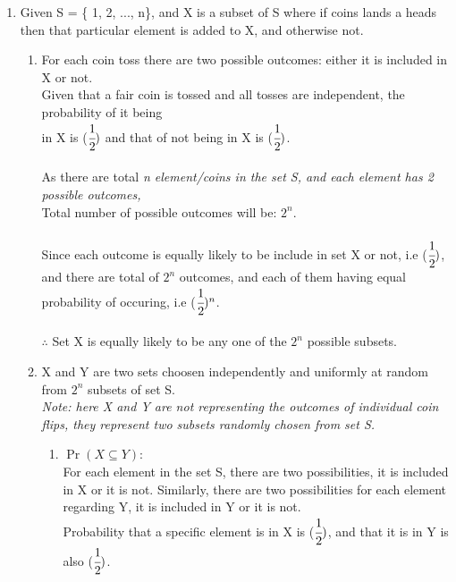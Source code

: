 \documentclass{article}
\begin{document}
\begin{enumerate}
  \newpage
  \item\textnormal{Given S = \{ 1, 2, ..., n\}, and X is a subset of S where if coins lands a heads then that particular element is added to X, and otherwise not.}\\
  \begin{enumerate}
    \item \textnormal{For each coin toss there are two possible outcomes: either it is included in X or not.}\\
    \textnormal{Given that a fair coin is tossed and all tosses are independent, the probability of it being}\\
    \textnormal{in X is ($\cfrac{1}{2})$ and that of not being in X is ($\cfrac{1}{2})$.}\\\\
    \textnormal{As there are total \it n \normalfont element/coins in the set S, and each element has 2 possible outcomes,}\\
    \textnormal{Total number of possible outcomes will be: $2^n$.}\\\\
    \textnormal{Since each outcome is equally likely to be include in set X or not, i.e ($\cfrac{1}{2})$,}
    \textnormal{and there are total of $2^n$ outcomes, and each of them having equal probability of occuring, i.e ($\cfrac{1}{2})^n$.}\\\\
    \textnormal{$\therefore$ Set X  is equally likely to be any one of the $2^n$ possible subsets.}\\
    \item \textnormal{X and Y are two sets choosen independently and uniformly at random from $2^n$ subsets of set S.}\\
    \textit{Note: here X and Y are not representing the outcomes of individual coin flips, they represent two subsets randomly chosen from set S.}\\
    \begin{enumerate}
      \item $\Pr(X \subseteq Y)$:\\
      \textnormal{For each element in the set S, there are two possibilities, it is included in X or it is not.}
      \textnormal{Similarly, there are two possibilities for each element regarding Y, it is included in Y or it is not.}\\
      \textnormal{Probability that a specific element is in X is ($\cfrac{1}{2})$, and that it is in Y is also ($\cfrac{1}{2})$.}\\

\end{enumerate}
\end{enumerate}
\end{enumerate}
\end{document}
